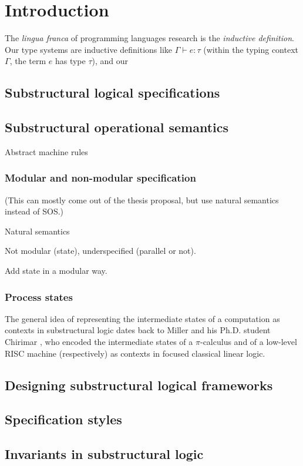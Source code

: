 \chapter{Introduction}
\label{chapter-introduction}

The {\it lingua franca} of programming languages research is the {\it
  inductive definition}. Our type systems are inductive definitions
like $\Gamma \vdash e : \tau$ (within the typing context $\Gamma$, 
the term $e$ has type $\tau$), and our 

\section{Substructural logical specifications}



\section{Substructural operational semantics}
\label{sec:intro-ssos}

Abstract machine rules

\subsection{Modular and non-modular specification}
\label{sec:modularnonmodular}

(This can mostly come out of the thesis proposal, but use 
natural semantics instead of SOS.)

Natural semantics

Not modular (state), underspecified (parallel or not).


Add state in a modular way.

\subsection{Process states}

The general idea of representing the
intermediate states of a computation as contexts in substructural
logic dates back to Miller \cite{miller92pi} and his Ph.D. student
Chirimar \cite{chirimar95proof}, who encoded the intermediate states
of a $\pi$-calculus and of a low-level RISC machine (respectively) as
contexts in focused classical linear logic.

\section{Designing substructural logical frameworks}

\section{Specification styles}

\section{Invariants in substructural logic}
